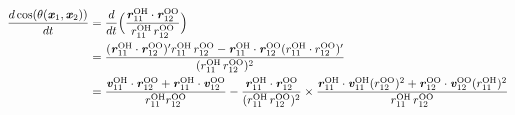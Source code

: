 \documentclass[unsortedaddress,a4paper,onecolumn]{revtex4}
\newcommand{\vect}[1]{\textbf{\textit{#1}}}
\newcommand{\oxy}[0]{{\textrm{O}}}
\newcommand{\hyd}[0]{{\textrm{H}}}
\begin{document}
\begin{align}\nonumber
  \frac{d \cos(\theta(\vect x_1, \vect x_2))}{dt}
  &=
  \frac{d}{dt}
  \Big (
  \frac{\vect r_{11}^{\oxy\hyd}\cdot \vect r_{12}^{\oxy\oxy}}{r_{11}^{\oxy\hyd} \, r_{12}^{\oxy\oxy}}
  \Big ) \\\nonumber
  &=
  \frac{(\vect r_{11}^{\oxy\hyd}\cdot \vect r_{12}^{\oxy\oxy})'r_{11}^{\oxy\hyd}\, r_{12}^{\oxy\oxy} - \vect r_{11}^{\oxy\hyd}\cdot \vect r_{12}^{\oxy\oxy} (r_{11}^{\oxy\hyd}\cdot r_{12}^{\oxy\oxy})'}{ ( r_{11}^{\oxy\hyd}\, r_{12}^{\oxy\oxy} )^2} \\\nonumber
  & =
  \frac{\vect v_{11}^{\oxy\hyd}\cdot \vect r_{12}^{\oxy\oxy}  + \vect r_{11}^{\oxy\hyd}\cdot \vect v_{12}^{\oxy\oxy}}{ r_{11}^{\oxy\hyd}r_{12}^{\oxy\oxy}}
  -
  \frac{\vect r_{11}^{\oxy\hyd}\cdot \vect r_{12}^{\oxy\oxy} } { ( r_{11}^{\oxy\hyd}\, r_{12}^{\oxy\oxy} )^2 } \times
  \frac{ \vect r_{11}^{\oxy\hyd}\cdot \vect v_{11}^{\oxy\hyd} (r_{12}^{\oxy\oxy})^2 + \vect r_{12}^{\oxy\oxy}\cdot \vect v_{12}^{\oxy\oxy} (r_{11}^{\oxy\hyd})^2  }{ r_{11}^{\oxy\hyd}\, r_{12}^{\oxy\oxy} }
  \\\nonumber  
\end{align}


{}

\end{document}
